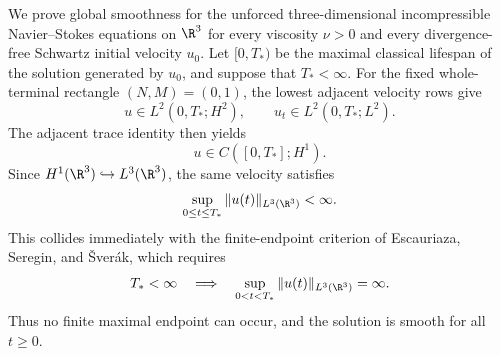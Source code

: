 
We prove global smoothness for the unforced three-dimensional incompressible Navier--Stokes equations on \(\R^3\) for every viscosity \(\nu>0\) and every divergence-free Schwartz initial velocity \(u_0\).
Let \([0,T_*)\) be the maximal classical lifespan of the solution generated by \(u_0\), and suppose that \(T_*<\infty\).
For the fixed whole-terminal rectangle \((N,M)=(0,1)\), the lowest adjacent velocity rows give
\[
u\in L^2(0,T_*;H^2),
\qquad
u_t\in L^2(0,T_*;L^2).
\]
The adjacent trace identity then yields
\[
u\in C([0,T_*];H^1).
\]
Since \(H^1(\R^3)\hookrightarrow L^3(\R^3)\), the same velocity satisfies
\[
\sup_{0\leq t\leq T_*}\|u(t)\|_{L^3(\R^3)}<\infty.
\]
This collides immediately with the finite-endpoint criterion of Escauriaza, Seregin, and \v{S}ver\'ak, which requires
\[
T_*<\infty
\quad\Longrightarrow\quad
\sup_{0<t<T_*}\|u(t)\|_{L^3(\R^3)}=\infty.
\]
Thus no finite maximal endpoint can occur, and the solution is smooth for all \(t\geq0\).
